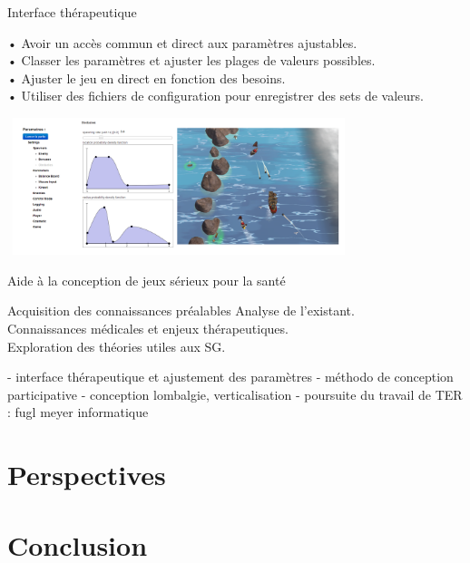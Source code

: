 \documentclass{beamer}
\begin{document}
		\begin{frame}{Interface thérapeutique}
			\begin{block}{}
				• Avoir un accès commun et direct aux paramètres ajustables.\\
				• Classer les paramètres et ajuster les plages de valeurs possibles.\\
				• Ajuster le jeu en direct en fonction des besoins.\\
				• Utiliser des fichiers de configuration pour enregistrer des sets de valeurs.
			\end{block}
			\includegraphics[width=10cm, height=4cm]{../images/comparatif_interface_rochers.png}		
		\end{frame}			
		
		\begin{frame}{Aide à la conception de jeux sérieux pour la santé}
			\begin{block}{Acquisition des connaissances préalables}
				Analyse de l'existant.\\
				Connaissances médicales et enjeux thérapeutiques.\\
				Exploration des théories utiles aux SG.				
			\end{block}
		\end{frame}
	
		\begin{frame}
			- interface thérapeutique et ajustement des paramètres
			- méthodo de conception participative
			- conception lombalgie, verticalisation
			- poursuite du travail de TER : fugl meyer informatique
		\end{frame}
	
	\section{Perspectives}
		\begin{frame}
		
		\end{frame}
	
	\section{Conclusion}
		\begin{frame}
		
		\end{frame}
\end{document}
